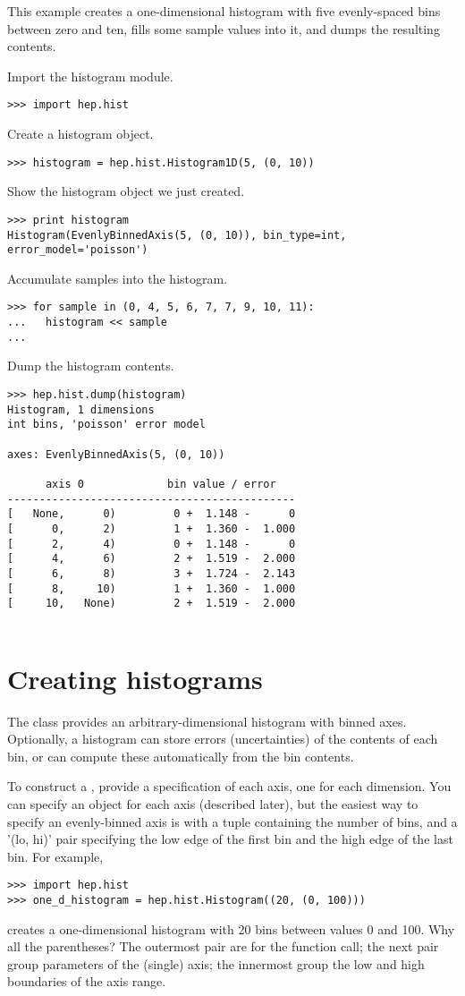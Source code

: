 This example creates a one-dimensional histogram with five evenly-spaced
bins between zero and ten, fills some sample values into it, and dumps
the resulting contents.

Import the histogram module.
\begin{verbatim}
>>> import hep.hist
\end{verbatim}
Create a histogram object.
\begin{verbatim}
>>> histogram = hep.hist.Histogram1D(5, (0, 10))
\end{verbatim}
Show the histogram object we just created.
\begin{verbatim}
>>> print histogram
Histogram(EvenlyBinnedAxis(5, (0, 10)), bin_type=int, error_model='poisson')
\end{verbatim}
Accumulate samples into the histogram.
\begin{verbatim}
>>> for sample in (0, 4, 5, 6, 7, 7, 9, 10, 11):
...   histogram << sample
...
\end{verbatim}
Dump the histogram contents.
\begin{verbatim}
>>> hep.hist.dump(histogram)
Histogram, 1 dimensions
int bins, 'poisson' error model
 
axes: EvenlyBinnedAxis(5, (0, 10))
 
      axis 0             bin value / error
---------------------------------------------
[   None,      0)         0 +  1.148 -      0
[      0,      2)         1 +  1.360 -  1.000
[      2,      4)         0 +  1.148 -      0
[      4,      6)         2 +  1.519 -  2.000
[      6,      8)         3 +  1.724 -  2.143
[      8,     10)         1 +  1.360 -  1.000
[     10,   None)         2 +  1.519 -  2.000
 
\end{verbatim}


\section{Creating histograms}

The class  provides an arbitrary-dimensional
histogram with binned axes.  Optionally, a histogram can store errors
(uncertainties) of the contents of each bin, or can compute these
automatically from the bin contents.

To construct a , provide a specification of each axis,
one for each dimension.  You can specify an  object for each
axis (described later), but the easiest way to specify an evenly-binned
axis is with a tuple containing the number of bins, and a '(lo, hi)'
pair specifying the low edge of the first bin and the high edge of the
last bin.  For example,
\begin{verbatim}
>>> import hep.hist
>>> one_d_histogram = hep.hist.Histogram((20, (0, 100)))
\end{verbatim}
creates a one-dimensional histogram with 20 bins between values 0
and 100.  Why all the parentheses?  The outermost pair are for the function
call; the next pair group parameters of the (single) axis; the innermost
group the low and high boundaries of the axis range.

